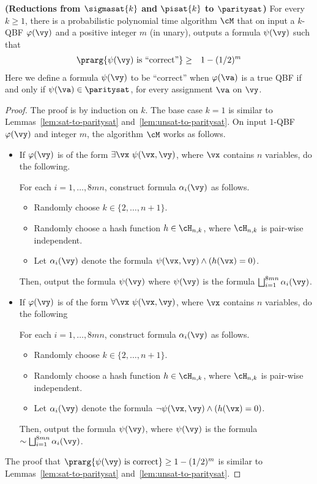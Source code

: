 \documentclass[11pt, a4paper]{article}
\begin{document}
\begin{lemma}
\label{lem:sigmasat-pisat-paritysat}
{\bf (Reductions from $\sigmasat{k}$ and $\pisat {k}$ to $\paritysat$)}
For every $k\geq 1$, there is a probabilistic polynomial time algorithm $\cM$ that
on input a $k$-QBF $\varphi(\vy)$ and a positive integer $m$ (in unary),
outputs a formula $\psi(\vy)$ such that 
\begin{eqnarray*}
\prarg {\psi(\vy) \ \text{is ``correct''}} & \geq & 1-(1/2)^m
\end{eqnarray*}
Here we define a formula $\psi(\vy)$ to be ``correct'' when
$\varphi(\va)$ is a true QBF if and only if $\psi(\va)\in\paritysat$,
for every assignment $\va$ on $\vy$.
\end{lemma}
\begin{proof}
The proof is by induction on $k$.
The base case $k=1$ is similar to Lemmas~\ref{lem:sat-to-paritysat} and~\ref{lem:unsat-to-paritysat}.
On input $1$-QBF $\varphi(\vy)$ and integer $m$,
the algorithm $\cM$ works as follows.
\begin{itemize}
\item
If $\varphi(\vy)$ is of the form $\exists\vx\ \psi(\vx,\vy)$,
where $\vx$ contains $n$ variables, do the following.

For each $i=1,\ldots,8mn$, construct formula $\alpha_i(\vy)$ as follows.
\begin{itemize}
\item
Randomly choose $k \in \{2,\ldots,n+1\}$.
\item 
Randomly choose a hash function $h\in \cH_{n,k}$, where $\cH_{n,k}$ is pair-wise independent.
\item 
Let $\alpha_i(\vy)$ denote the formula $\psi(\vx,\vy) \wedge (h(\vx)=0)$.
\end{itemize}
Then, output the formula $\psi(\vy)$ where $\psi(\vy)$ is the formula $\bigsqcup_{i=1}^{8mn} \alpha_i(\vy)$.

\item
If $\varphi(\vy)$ is of the form $\forall\vx\ \psi(\vx,\vy)$,
where $\vx$ contains $n$ variables, do the following

For each $i=1,\ldots,8mn$, construct formula $\alpha_i(\vy)$ as follows.
\begin{itemize}
\item
Randomly choose $k \in \{2,\ldots,n+1\}$.
\item 
Randomly choose a hash function $h\in \cH_{n,k}$, where $\cH_{n,k}$ is pair-wise independent.
\item 
Let $\alpha_i(\vy)$ denote the formula $\neg\psi(\vx,\vy) \wedge (h(\vx)=0)$.
\end{itemize}
Then, output the formula $\psi(\vy)$, where $\psi(\vy)$ is the formula $\sim \bigsqcup_{i=1}^{8mn}\alpha_i(\vy)$.
\end{itemize}
The proof that 
$\prarg {\psi(\vy) \ \text{is correct}}\geq 1-(1/2)^m$ 
is similar to Lemmas~\ref{lem:sat-to-paritysat} and~\ref{lem:unsat-to-paritysat}.
 

\end{proof}
\end{document}
